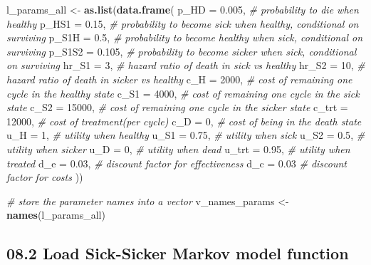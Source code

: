\documentclass[]{article}
\newenvironment{Shaded}{\begin{snugshade}}{\end{snugshade}}
\newcommand{\KeywordTok}[1]{\textcolor[rgb]{0.13,0.29,0.53}{\textbf{#1}}}
\newcommand{\DataTypeTok}[1]{\textcolor[rgb]{0.13,0.29,0.53}{#1}}
\newcommand{\DecValTok}[1]{\textcolor[rgb]{0.00,0.00,0.81}{#1}}
\newcommand{\FloatTok}[1]{\textcolor[rgb]{0.00,0.00,0.81}{#1}}
\newcommand{\StringTok}[1]{\textcolor[rgb]{0.31,0.60,0.02}{#1}}
\newcommand{\CommentTok}[1]{\textcolor[rgb]{0.56,0.35,0.01}{\textit{#1}}}
\newcommand{\NormalTok}[1]{#1}
\begin{document}
\begin{Shaded}
\begin{Highlighting}[]
\NormalTok{l_params_all <-}\StringTok{ }\KeywordTok{as.list}\NormalTok{(}\KeywordTok{data.frame}\NormalTok{(}
  \DataTypeTok{p_HD    =} \FloatTok{0.005}\NormalTok{,  }\CommentTok{# probability to die when healthy}
  \DataTypeTok{p_HS1   =} \FloatTok{0.15}\NormalTok{,   }\CommentTok{# probability to become sick when healthy, conditional on surviving}
  \DataTypeTok{p_S1H   =} \FloatTok{0.5}\NormalTok{,    }\CommentTok{# probability to become healthy when sick, conditional on surviving}
  \DataTypeTok{p_S1S2  =} \FloatTok{0.105}\NormalTok{,  }\CommentTok{# probability to become sicker when sick, conditional on surviving}
  \DataTypeTok{hr_S1   =} \DecValTok{3}\NormalTok{,      }\CommentTok{# hazard ratio of death in sick vs healthy}
  \DataTypeTok{hr_S2   =} \DecValTok{10}\NormalTok{,     }\CommentTok{# hazard ratio of death in sicker vs healthy}
  \DataTypeTok{c_H     =} \DecValTok{2000}\NormalTok{,   }\CommentTok{# cost of remaining one cycle in the healthy state}
  \DataTypeTok{c_S1    =} \DecValTok{4000}\NormalTok{,   }\CommentTok{# cost of remaining one cycle in the sick state}
  \DataTypeTok{c_S2    =} \DecValTok{15000}\NormalTok{,  }\CommentTok{# cost of remaining one cycle in the sicker state}
  \DataTypeTok{c_trt   =} \DecValTok{12000}\NormalTok{,  }\CommentTok{# cost of treatment(per cycle)}
  \DataTypeTok{c_D     =} \DecValTok{0}\NormalTok{,      }\CommentTok{# cost of being in the death state}
  \DataTypeTok{u_H     =} \DecValTok{1}\NormalTok{,      }\CommentTok{# utility when healthy}
  \DataTypeTok{u_S1    =} \FloatTok{0.75}\NormalTok{,   }\CommentTok{# utility when sick}
  \DataTypeTok{u_S2    =} \FloatTok{0.5}\NormalTok{,    }\CommentTok{# utility when sicker}
  \DataTypeTok{u_D     =} \DecValTok{0}\NormalTok{,      }\CommentTok{# utility when dead}
  \DataTypeTok{u_trt   =} \FloatTok{0.95}\NormalTok{,   }\CommentTok{# utility when treated}
  \DataTypeTok{d_e     =} \FloatTok{0.03}\NormalTok{,   }\CommentTok{# discount factor for effectiveness}
  \DataTypeTok{d_c     =} \FloatTok{0.03}    \CommentTok{# discount factor for costs}
\NormalTok{))}

\CommentTok{# store the parameter names into a vector}
\NormalTok{v_names_params <-}\StringTok{ }\KeywordTok{names}\NormalTok{(l_params_all)}
\end{Highlighting}
\end{Shaded}

\subsection{08.2 Load Sick-Sicker Markov model
function}\label{load-sick-sicker-markov-model-function}
\end{document}
